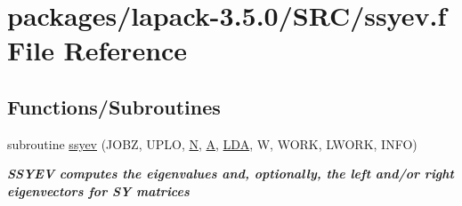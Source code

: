 \hypertarget{ssyev_8f}{}\section{packages/lapack-\/3.5.0/\+S\+R\+C/ssyev.f File Reference}
\label{ssyev_8f}
\subsection*{Functions/\+Subroutines}
\begin{DoxyCompactItemize}
\item 
subroutine \hyperlink{group__realSYeigen_ga63d8d12aef8f2711d711d9e6bd833e46}{ssyev} (J\+O\+B\+Z, U\+P\+L\+O, \hyperlink{polmisc_8c_a0240ac851181b84ac374872dc5434ee4}{N}, \hyperlink{classA}{A}, \hyperlink{example__user_8c_ae946da542ce0db94dced19b2ecefd1aa}{L\+D\+A}, W, W\+O\+R\+K, L\+W\+O\+R\+K, I\+N\+F\+O)
\begin{DoxyCompactList}\small\item\em {\bfseries  S\+S\+Y\+E\+V computes the eigenvalues and, optionally, the left and/or right eigenvectors for S\+Y matrices} \end{DoxyCompactList}\end{DoxyCompactItemize}
